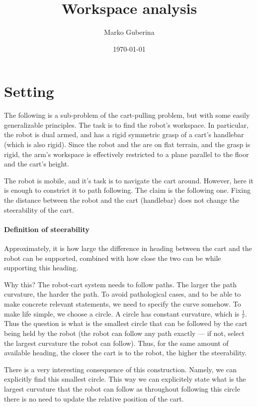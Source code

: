 \documentclass{article}
\title{Workspace analysis}
\date{\today}
\author{Marko Guberina}
\begin{document}
\maketitle
\section{Setting}
\label{sec-setting}
The following is a sub-problem of the cart-pulling problem,
but with some easily generalizable principles.
The task is to find the robot's workspace.
In particular, the robot is dual armed,
and has a rigid symmetric grasp of a cart's handlebar (which is also rigid).
Since the robot and the are on flat terrain, 
and the grasp is rigid,
the arm's workspace is effectively restricted to a plane
parallel to the floor and the cart's height.

The robot is mobile, and it's task is to navigate the cart around.
However, here it is enough to constrict it to path following.
The claim is the following one.
Fixing the distance between the robot and the cart (handlebar)
does not change the steerability of the cart.

\paragraph{Definition of steerability}
Approximately, it is how large the difference in heading between the cart
and the robot can be supported, combined with how close the two can be
while supporting this heading.

Why this? The robot-cart system needs to follow paths.
The larger the path curvature, the harder the path.
To avoid pathological cases, and to be able to make 
concrete relevant statements, we need to specify the curve somehow.
To make life simple, we choose a circle.
A circle has constant curvature, which is $\frac{1}{r}$.
Thus the question is what is the smallest circle that can be followed by 
the cart being held by the robot (the robot can follow any path exactly
--- if not, select the largest curvature the robot can follow).
Thus, for the same amount of available heading, the closer the
cart is to the robot, the higher the steerability.

There is a very interesting consequence of this construction.
Namely, we can explicitly find this smallest circle.
This way we can explicitely state what is the largest curvature
that the robot can follow as throughout following this circle
there is no need to update the relative position of the cart.
\end{document}
